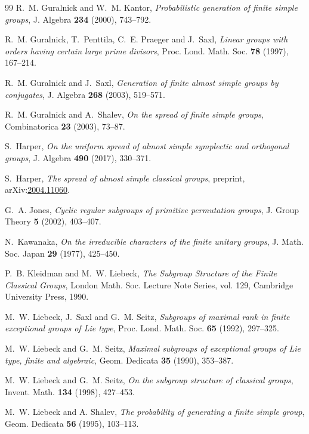\documentclass[11pt]{article}
\numberwithin{equation}{section}
\renewenvironment{thebibliography}[1]
{ \begin{oldthebibliography}{#1}
  \setlength{\parskip}{0pt}
  \setlength{\itemsep}{2pt plus 0.3ex}
  \bgroup\footnotesize }
{ \egroup \end{oldthebibliography} }
\theoremstyle{shdefinition}
\theoremstyle{shplain}
\newcommand{\<}{\langle}
\renewcommand{\>}{\rangle}
\renewcommand{\:}{\colon}
\begin{document}
\begin{thebibliography}{99}
R.~M. Guralnick and W.~M. Kantor, \emph{Probabilistic generation of finite
  simple groups}, J. Algebra \textbf{234} (2000), 743--792.

R.~M. Guralnick, T.~Penttila, C.~E. Praeger and J.~Saxl, \emph{Linear groups
  with orders having certain large prime divisors}, Proc. Lond. Math. Soc.
  \textbf{78} (1997), 167--214.

R.~M. Guralnick and J.~Saxl, \emph{Generation of finite almost simple groups by
  conjugates}, J. Algebra \textbf{268} (2003), 519--571.

R.~M. Guralnick and A.~Shalev, \emph{On the spread of finite simple groups},
  Combinatorica \textbf{23} (2003), 73--87.

S.~Harper, \emph{On the uniform spread of almost simple symplectic and
  orthogonal groups}, J. Algebra \textbf{490} (2017), 330--371.

S.~Harper, \emph{The spread of almost simple classical groups}, {preprint},
  arXiv:\url{2004.11060}.

G.~A. Jones, \emph{Cyclic regular subgroups of primitive permutation groups},
  J. Group Theory \textbf{5} (2002), 403--407.

N.~Kawanaka, \emph{On the irreducible characters of the finite unitary groups},
  J. Math. Soc. Japan \textbf{29} (1977), 425--450.

P.~B. Kleidman and M.~W. Liebeck, \emph{The Subgroup Structure of the Finite
  Classical Groups}, London Math. Soc. Lecture Note Series, vol. 129, Cambridge
  University Press, 1990.

M.~W. Liebeck, J.~Saxl and G.~M. Seitz, \emph{Subgroups of maximal rank in
  finite exceptional groups of {L}ie type}, Proc. Lond. Math. Soc. \textbf{65}
  (1992), 297--325.

M.~W. Liebeck and G.~M. Seitz, \emph{Maximal subgroups of exceptional groups of
  {L}ie type, finite and algebraic}, Geom. Dedicata \textbf{35} (1990),
  353--387.

M.~W. Liebeck and G.~M. Seitz, \emph{On the subgroup structure of classical
  groups}, Invent. Math. \textbf{134} (1998), 427--453.
  
M.~W. Liebeck and A. Shalev, \emph{The probability of generating a finite simple 
  group}, Geom. Dedicata \textbf{56} (1995), 103--113.
  

\end{thebibliography}
\end{document}
